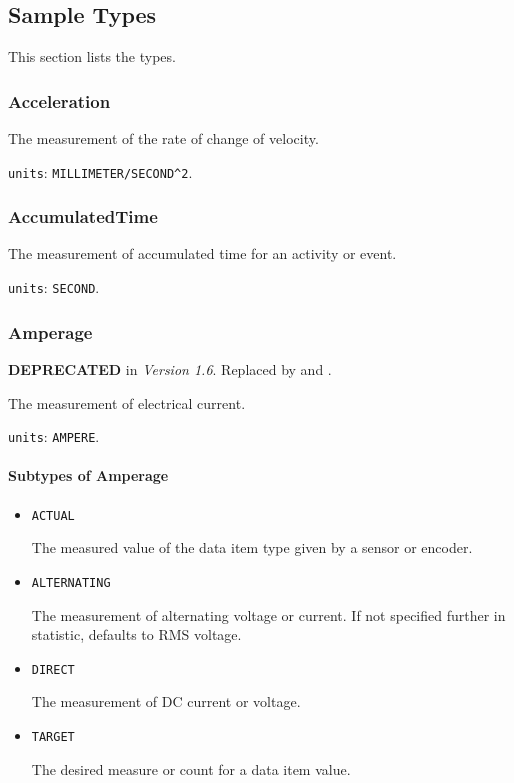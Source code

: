 \subsection{Sample Types} \label{sec:Sample Types}


This section lists the  types.


\subsubsection{Acceleration}
\label{sec:Acceleration}



The measurement of the rate of change of velocity.


\texttt{units}: \texttt{MILLIMETER/SECOND\^{}2}.


\subsubsection{AccumulatedTime}
\label{sec:AccumulatedTime}



The measurement of accumulated time for an activity or event.


\texttt{units}: \texttt{SECOND}.


\subsubsection{Amperage}
\label{sec:Amperage}



\textbf{DEPRECATED} in \textit{Version 1.6}. Replaced by  and .

The measurement of electrical current.


\texttt{units}: \texttt{AMPERE}.

\paragraph{Subtypes of Amperage}\mbox{}
\label{sec:Subtypes of Amperage}

\begin{itemize}

\item \texttt{ACTUAL}


The measured value of the data item type given by a sensor or encoder.

\item \texttt{ALTERNATING}


The measurement of alternating voltage or current.   If not specified further in statistic, defaults to RMS voltage. 

\item \texttt{DIRECT}


The measurement of DC current or voltage.

\item \texttt{TARGET}


The desired measure or count for a data item value.


\end{itemize}







